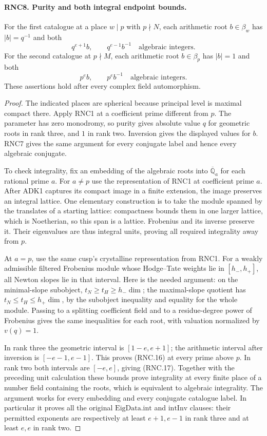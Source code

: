 \documentclass[11pt,a4paper]{article}
\numberwithin{equation}{section}
\theoremstyle{remark}\newtheorem{remark}[theorem]{Remark}
\begin{document}
\paragraph{RNC8. Purity and both integral endpoint bounds.}
\label{claim:RNC8}
For the first catalogue at a place $w\mid p$ with
$p\nmid N$, each arithmetic root $b\in\beta_w$ has
$|b|=q^{-1}$ and both
\[
          q^{e+1}b,\qquad q^{e-1}b^{-1}
                       \quad\text{algebraic integers}.       \tag{RNC.16}
\]
For the second catalogue at $p\nmid M$, each arithmetic
root $b\in\beta_p$ has $|b|=1$ and both
\[
                    p^e b,\qquad p^e b^{-1}
                       \quad\text{algebraic integers}.       \tag{RNC.17}
\]
These assertions hold after every complex field automorphism.
\begin{proof}
The indicated places are spherical because principal level
is maximal compact there.  Apply RNC1 at a coefficient
prime different from $p$.  The parameter has zero monodromy,
so purity gives absolute value $q$ for geometric roots in
rank three, and $1$ in rank two.  Inversion gives the
displayed values for $b$.  RNC7 gives the same argument for
every conjugate label and hence every algebraic conjugate.

To check integrality, fix an embedding of the algebraic
roots into $\overline{\mathbb Q}_a$ for each rational prime
$a$.  For $a\ne p$ use the representation of RNC1 at
coefficient prime $a$.  After ADK1 captures its compact
image in a finite extension, the image preserves an
integral lattice.  One elementary construction is to take
the module spanned by the translates of a starting lattice:
compactness bounds them in one larger lattice, which is
Noetherian, so this span is a lattice.  Frobenius and its
inverse preserve it.  Their eigenvalues are thus integral
units, proving all required integrality away from $p$.

At $a=p$, use the same cusp's crystalline representation
from RNC1.  For a weakly admissible filtered Frobenius
module whose Hodge--Tate weights lie in $[h_-,h_+]$, all
Newton slopes lie in that interval.  Here is the needed
argument: on the minimal-slope subobject,
$t_N\geq t_H\geq h_-\dim$; the maximal-slope quotient has
$t_N\leq t_H\leq h_+\dim$, by the subobject inequality
and equality for the whole module.  Passing to a splitting
coefficient field and to a residue-degree power of Frobenius
gives the same inequalities for each root, with valuation
normalized by $v(q)=1$.

In rank three the geometric interval is $[1-e,e+1]$;
the arithmetic interval after inversion is
$[-e-1,e-1]$.  This proves (RNC.16) at every prime above
$p$.  In rank two both intervals are $[-e,e]$, giving
(RNC.17).  Together with the preceding unit calculation
these bounds prove integrality at every finite place of
a number field containing the roots, which is equivalent
to algebraic integrality.  The argument works for every
embedding and every conjugate catalogue label.  In
particular it proves all the original $\mathrm{EigData.int}$
and $\mathrm{intInv}$ clauses: their permitted exponents
are respectively at least $e+1,e-1$ in rank three and
at least $e,e$ in rank two.
\end{proof}
\end{document}
